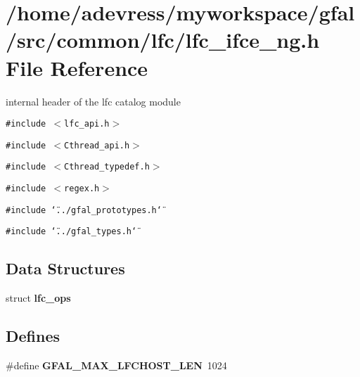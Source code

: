 \section{/home/adevress/myworkspace/gfal/src/common/lfc/lfc\_\-ifce\_\-ng.h File Reference}
\label{lfc__ifce__ng_8h}
internal header of the lfc catalog module 

{\tt \#include $<$lfc\_\-api.h$>$}\par
{\tt \#include $<$Cthread\_\-api.h$>$}\par
{\tt \#include $<$Cthread\_\-typedef.h$>$}\par
{\tt \#include $<$regex.h$>$}\par
{\tt \#include \char`\"{}../gfal\_\-prototypes.h\char`\"{}}\par
{\tt \#include \char`\"{}../gfal\_\-types.h\char`\"{}}\par
\subsection*{Data Structures}
\begin{CompactItemize}
\item 
struct \textbf{lfc\_\-ops}
\end{CompactItemize}
\subsection*{Defines}
\begin{CompactItemize}
\item 
\#define \textbf{GFAL\_\-MAX\_\-LFCHOST\_\-LEN}~1024\label{lfc__ifce__ng_8h_4ba01f362057d237e7234f527da40cdb}

\end{CompactItemize}
